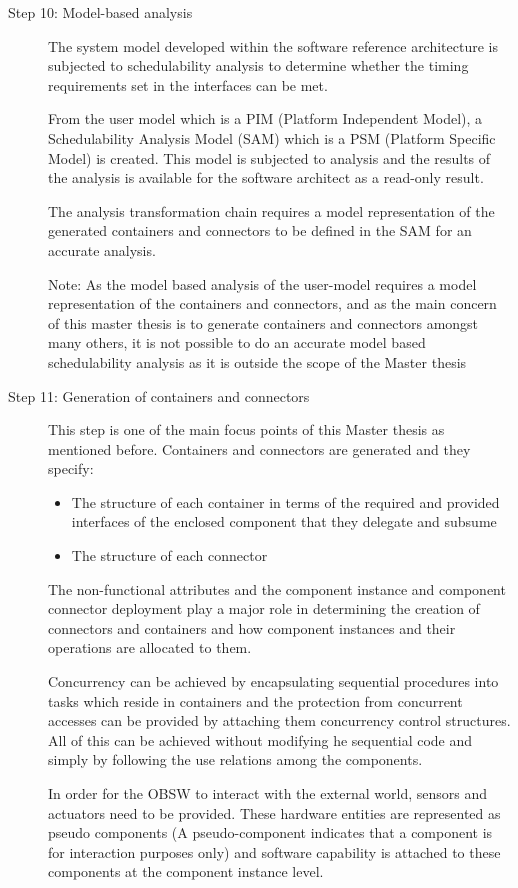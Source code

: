 \begin{description}
\item [Step 10: Model-based analysis] The system model developed within the software reference architecture is subjected to schedulability analysis to determine whether the timing requirements set in the interfaces can be met.

From the user model which is a PIM (Platform Independent Model), a Schedulability Analysis Model (SAM) which is a PSM (Platform Specific Model) is created. This model is subjected to analysis and the results of the analysis is available for the software architect as a read-only result. 

The analysis transformation chain requires a model representation of the generated containers and connectors to be defined in the SAM for an accurate analysis.

Note: As the model based analysis of the user-model requires a model representation of the containers and connectors, and as the main concern of this master thesis is to generate containers and connectors amongst many others, it is not possible to do an accurate model based schedulability analysis as it is outside the scope of the Master thesis 

\item [Step 11: Generation of containers and connectors]  This step is one of the main focus points of this Master thesis as mentioned before. Containers and connectors are generated and they specify:
\begin{itemize}
\item The structure of each container in terms of the required and provided interfaces of the enclosed component that they delegate and subsume
\item The structure of each connector 
\end{itemize} 
The non-functional attributes and the component instance and component connector deployment play a major role in determining the creation of connectors and containers and how component instances and their operations are allocated to them.

Concurrency can be achieved by encapsulating sequential procedures into tasks which reside in containers and the protection from concurrent accesses can be provided by attaching them concurrency control structures. All of this can be achieved without modifying he sequential code and simply by following the use relations among the components.

In order for the OBSW to interact with the external world, sensors and actuators need to be provided. These hardware entities are represented as pseudo components (A pseudo-component indicates that a component is for interaction purposes only) and software capability is attached to these components at the component instance level.    
\end{description}

